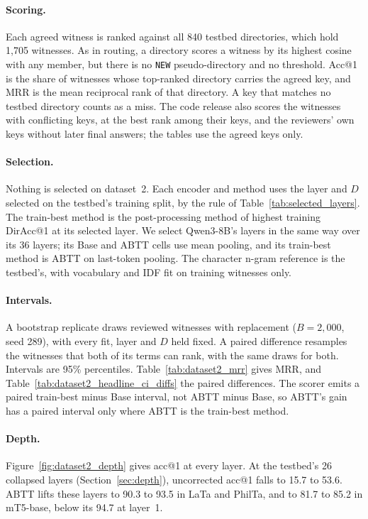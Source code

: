 \documentclass[11pt]{article}
\begin{document}
\paragraph{Scoring.}
Each agreed witness is ranked against all 840 testbed directories, which hold 1,705 witnesses.
As in routing, a directory scores a witness by its highest cosine with any member, but there is no \texttt{NEW} pseudo-directory and no threshold.
Acc@1 is the share of witnesses whose top-ranked directory carries the agreed key, and MRR is the mean reciprocal rank of that directory.
A key that matches no testbed directory counts as a miss.
The code release also scores the witnesses with conflicting keys, at the best rank among their keys, and the reviewers' own keys without later final answers; the tables use the agreed keys only.

\paragraph{Selection.}
Nothing is selected on dataset~2.
Each encoder and method uses the layer and $D$ selected on the testbed's training split, by the rule of Table~\ref{tab:selected_layers}.
The train-best method is the post-processing method of highest training DirAcc@1 at its selected layer.
We select Qwen3-8B's layers in the same way over its 36 layers; its Base and ABTT cells use mean pooling, and its train-best method is ABTT on last-token pooling.
The character n-gram reference is the testbed's, with vocabulary and IDF fit on training witnesses only.

\paragraph{Intervals.}
A bootstrap replicate draws reviewed witnesses with replacement ($B=2{,}000$, seed 289), with every fit, layer and $D$ held fixed.
A paired difference resamples the witnesses that both of its terms can rank, with the same draws for both.
Intervals are 95\% percentiles.
Table~\ref{tab:dataset2_mrr} gives MRR, and Table~\ref{tab:dataset2_headline_ci_diffs} the paired differences.
The scorer emits a paired train-best minus Base interval, not ABTT minus Base, so ABTT's gain has a paired interval only where ABTT is the train-best method.

\paragraph{Depth.}
Figure~\ref{fig:dataset2_depth} gives acc@1 at every layer.
At the testbed's 26 collapsed layers (Section~\ref{sec:depth}), uncorrected acc@1 falls to 15.7 to 53.6.
ABTT lifts these layers to 90.3 to 93.5 in LaTa and PhilTa, and to 81.7 to 85.2 in mT5-base, below its 94.7 at layer~1.
\end{document}

